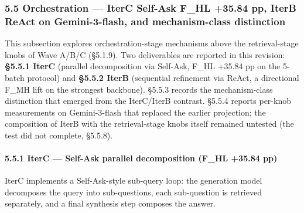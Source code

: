 \documentclass[
]{article}
\begin{document}
\subsubsection{5.5 Orchestration --- IterC Self-Ask F\_HL +35.84 pp,
IterB ReAct on Gemini-3-flash, and mechanism-class
distinction}\label{orchestration-iterc-self-ask-f_hl-35.84-pp-iterb-react-on-gemini-3-flash-and-mechanism-class-distinction}

This subsection explores orchestration-stage mechanisms above the
retrieval-stage knobs of Wave A/B/C (§5.1.9). Two deliverables are
reported in this revision: \textbf{§5.5.1 IterC} (parallel decomposition
via Self-Ask, F\_HL +35.84 pp on the 5-batch protocol) and
\textbf{§5.5.2 IterB} (sequential refinement via ReAct, a directional
F\_MH lift on the strongest backbone). §5.5.3 records the
mechanism-class distinction that emerged from the IterC/IterB contrast.
§5.5.4 reports per-knob measurements on Gemini-3-flash that replaced the
earlier projection; the composition of IterB with the retrieval-stage
knobs itself remained untested (the test did not complete, §5.5.8).

\paragraph{5.5.1 IterC --- Self-Ask parallel decomposition (F\_HL +35.84
pp)}\label{iterc-self-ask-parallel-decomposition-f_hl-35.84-pp}

IterC implements a Self-Ask-style sub-query loop: the generation model
decomposes the query into sub-questions, each sub-question is retrieved
separately, and a final synthesis step composes the answer.
\end{document}
